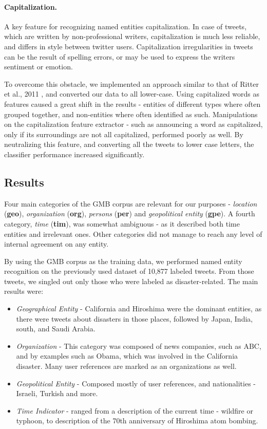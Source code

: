 \documentclass[letterpaper,twocolumn,10pt]{article}
\begin{document}
\paragraph{Capitalization.} A key feature for recognizing named entities capitalization. In case of tweets, which are written by non-professional writers, capitalization is much less reliable, and differs in style between twitter users. Capitalization irregularities in tweets can be the result of spelling errors, or may be used to express the writers sentiment or emotion.

To overcome this obstacle, we implemented an approach similar to that of Ritter et al., 2011 \cite{Ritter11}, and converted our data to all lower-case. Using capitalized words as features caused a great shift in the results - entities of different types where often grouped together, and non-entities where often identified as such. Manipulations on the capitalization feature extractor - such as announcing a word as capitalized, only if its surroundings are not all capitalized, performed poorly as well. By neutralizing this feature, and converting all the tweets to lower case letters, the classifier performance increased significantly.

\subsection{Results}

Four main categories of the GMB corpus are relevant for our purposes - \textit{location} (\textbf{geo}), \textit{organization} (\textbf{org}), \textit{persons} (\textbf{per}) and \textit{geopolitical entity} (\textbf{gpe}). A fourth category, \textit{time} (\textbf{tim}), was somewhat ambiguous - as it described both time entities and irrelevant ones. Other categories did not manage to reach any level of internal agreement on any entity.

By using the GMB corpus as the training data, we performed named entity recognition on the previously used dataset of 10,877 labeled tweets. From those tweets, we singled out only those who were labeled as disaster-related. The main results were:

\begin{itemize}[noitemsep, nolistsep]
	\item \textit{Geographical Entity} - California and Hiroshima were the dominant entities, as there were tweets about disasters in those places, followed by Japan, India, south, and Saudi Arabia.
	\item \textit{Organization} - This category was composed of news companies, such as ABC, and by examples such as Obama, which was involved in the California disaster. Many user references are marked as an organizations as well.
	\item \textit{Geopolitical Entity} - Composed mostly of user references, and nationalities - Israeli, Turkish and more.
	\item \textit{Time Indicator} - ranged from a description of the current time - wildfire or typhoon, to description of the 70th anniversary of Hiroshima atom bombing.
\end{itemize}
\end{document}
